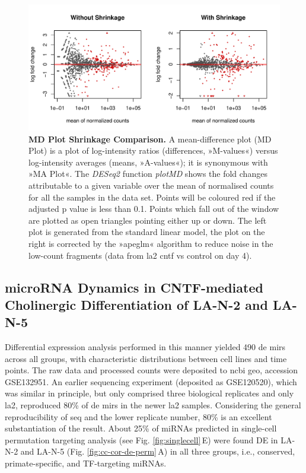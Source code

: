 \begin{figure}[ht]
\centering
\includegraphics[width=\textwidth]{figures/apeglm-comp-la2d4}
\caption[MD Plot Shrinkage Comparison.]{\textbf{MD Plot Shrinkage Comparison.} A mean-difference plot (MD Plot) is a plot of log-intensity ratios (differences, »M-values«) versus log-intensity averages (means, »A-values«); it is synonymous with »MA Plot«. The \textit{DESeq2} function \textit{plotMD} shows the fold changes attributable to a given variable over the mean of normalised counts for all the samples in the data set. Points will be coloured red if the adjusted p value is less than 0.1. Points which fall out of the window are plotted as open triangles pointing either up or down. The left plot is generated from the standard linear model, the plot on the right is corrected by the »apeglm« algorithm\cite{Zhu2019} to reduce noise in the low-count fragments (data from \ac{la2} \ac{cntf} vs control on day 4).
\label{fig:apeglm-comp-la2d4}}
\end{figure}

\subsection{microRNA Dynamics in CNTF-mediated Cholinergic Differentiation of LA-N-2 and LA-N-5}
Differential expression analysis performed in this manner yielded 490 \ac{de} \acp{mir} across all groups, with characteristic distributions between cell lines and time points. The raw data and processed counts were deposited to \ac{ncbi} \ac{geo}, accession GSE132951. An earlier sequencing experiment (deposited as GSE120520), which was similar in principle, but only comprised three biological replicates and only \ac{la2}, reproduced 80\% of \ac{de} \acp{mir} in the newer \ac{la2} samples. Considering the general reproducibility of \ac{seq} and the lower replicate number, 80\% is an excellent substantiation of the result. About 25\% of miRNAs predicted in single-cell permutation targeting analysis (see Fig. \ref{fig:singlecell}\,E) were found DE in LA-N-2 and LA-N-5 (Fig. \ref{fig:cc-cor-de-perm}\,A) in all three groups, i.e., conserved, primate-specific, and TF-targeting miRNAs.  

